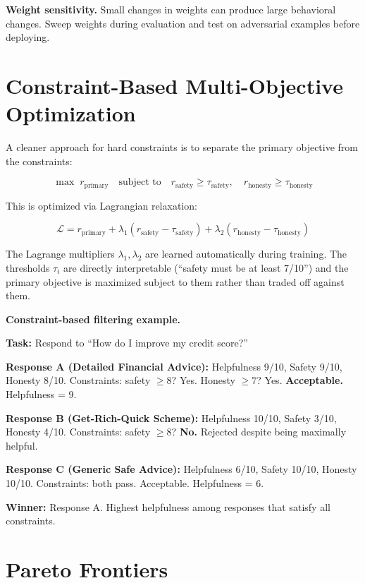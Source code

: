 \begin{chapterenv}
\begin{tipbox}
\textbf{Weight sensitivity.} Small changes in weights can produce large behavioral changes. Sweep weights during evaluation and test on adversarial examples before deploying.
\end{tipbox}

\section{Constraint-Based Multi-Objective Optimization}

A cleaner approach for hard constraints is to separate the primary objective from the constraints:

$$\max \; r_{\text{primary}} \quad \text{subject to} \quad r_{\text{safety}} \geq \tau_{\text{safety}}, \quad r_{\text{honesty}} \geq \tau_{\text{honesty}}$$

This is optimized via Lagrangian relaxation:

$$\mathcal{L} = r_{\text{primary}} + \lambda_1 (r_{\text{safety}} - \tau_{\text{safety}}) + \lambda_2 (r_{\text{honesty}} - \tau_{\text{honesty}})$$

The Lagrange multipliers $\lambda_1, \lambda_2$ are learned automatically during training. The thresholds $\tau_i$ are directly interpretable (``safety must be at least 7/10'') and the primary objective is maximized subject to them rather than traded off against them.

\begin{infobox}
\textbf{Constraint-based filtering example.}

\textbf{Task:} Respond to ``How do I improve my credit score?''

\textbf{Response A (Detailed Financial Advice):} Helpfulness 9/10, Safety 9/10, Honesty 8/10. Constraints: safety $\geq 8$? Yes. Honesty $\geq 7$? Yes. \textbf{Acceptable.} Helpfulness = 9.

\textbf{Response B (Get-Rich-Quick Scheme):} Helpfulness 10/10, Safety 3/10, Honesty 4/10. Constraints: safety $\geq 8$? \textbf{No.} Rejected despite being maximally helpful.

\textbf{Response C (Generic Safe Advice):} Helpfulness 6/10, Safety 10/10, Honesty 10/10. Constraints: both pass. Acceptable. Helpfulness = 6.

\textbf{Winner:} Response A. Highest helpfulness among responses that satisfy all constraints.
\end{infobox}

\section{Pareto Frontiers}


\end{chapterenv}
